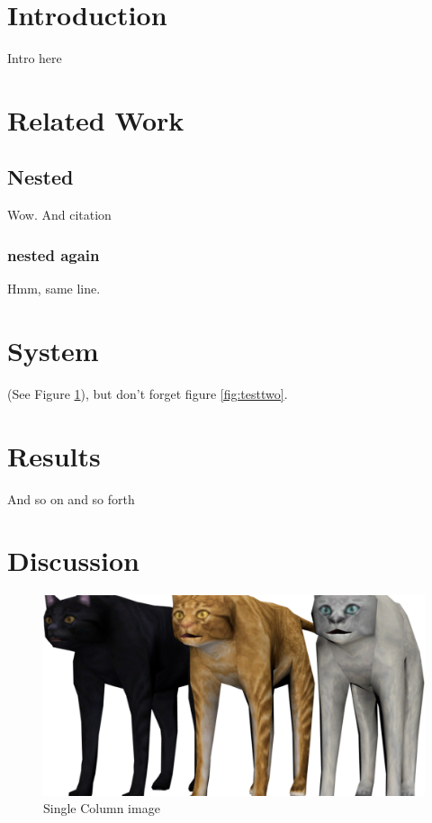 \documentclass[sigconf, screen, review]{acmart}
\begin{document}

\maketitle

\section{Introduction}
\par Intro here

\section{Related Work}
\subsection{Nested}
\par Wow. And citation \cite{test-key}
\subsubsection{nested again}
\par Hmm, same line.

\section{System}
\par (See Figure \ref{fig:testone}), but don't forget figure \ref{fig:testtwo}.
\section{Results}
\par And so on and so forth

\section{Discussion}
\begin{figure}[!htbp]
	\centering
	\includegraphics[width=0.85\linewidth]{images/example.png}
	\caption{Single Column image}
	\label{fig:testone}
\end{figure}
\end{document}
